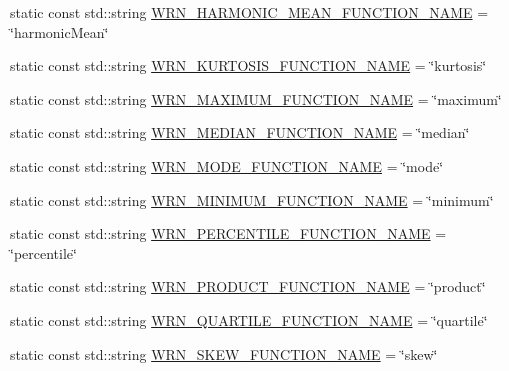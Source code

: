 \begin{DoxyCompactItemize}
\item 
static const std\-::string \hyperlink{classmultiscale_1_1Numeric_a48747552d1ae9179e97e3c9b32e86220}{\-W\-R\-N\-\_\-\-H\-A\-R\-M\-O\-N\-I\-C\-\_\-\-M\-E\-A\-N\-\_\-\-F\-U\-N\-C\-T\-I\-O\-N\-\_\-\-N\-A\-M\-E} = \char`\"{}harmonic\-Mean\char`\"{}
\item 
static const std\-::string \hyperlink{classmultiscale_1_1Numeric_a917a1224a1d3d2dc3ce2937a519b3a03}{\-W\-R\-N\-\_\-\-K\-U\-R\-T\-O\-S\-I\-S\-\_\-\-F\-U\-N\-C\-T\-I\-O\-N\-\_\-\-N\-A\-M\-E} = \char`\"{}kurtosis\char`\"{}
\item 
static const std\-::string \hyperlink{classmultiscale_1_1Numeric_aa76828c54d236550a16b8b3e189a892a}{\-W\-R\-N\-\_\-\-M\-A\-X\-I\-M\-U\-M\-\_\-\-F\-U\-N\-C\-T\-I\-O\-N\-\_\-\-N\-A\-M\-E} = \char`\"{}maximum\char`\"{}
\item 
static const std\-::string \hyperlink{classmultiscale_1_1Numeric_a4ff61e6a5c3cd99f6f69a539d8790ec5}{\-W\-R\-N\-\_\-\-M\-E\-D\-I\-A\-N\-\_\-\-F\-U\-N\-C\-T\-I\-O\-N\-\_\-\-N\-A\-M\-E} = \char`\"{}median\char`\"{}
\item 
static const std\-::string \hyperlink{classmultiscale_1_1Numeric_a1c7fbb1e805d5c6a93c0db380327fb12}{\-W\-R\-N\-\_\-\-M\-O\-D\-E\-\_\-\-F\-U\-N\-C\-T\-I\-O\-N\-\_\-\-N\-A\-M\-E} = \char`\"{}mode\char`\"{}
\item 
static const std\-::string \hyperlink{classmultiscale_1_1Numeric_abe70187af1f3c5e168ee696836e51940}{\-W\-R\-N\-\_\-\-M\-I\-N\-I\-M\-U\-M\-\_\-\-F\-U\-N\-C\-T\-I\-O\-N\-\_\-\-N\-A\-M\-E} = \char`\"{}minimum\char`\"{}
\item 
static const std\-::string \hyperlink{classmultiscale_1_1Numeric_a8d81f8548808bc79d7a63913866d848f}{\-W\-R\-N\-\_\-\-P\-E\-R\-C\-E\-N\-T\-I\-L\-E\-\_\-\-F\-U\-N\-C\-T\-I\-O\-N\-\_\-\-N\-A\-M\-E} = \char`\"{}percentile\char`\"{}
\item 
static const std\-::string \hyperlink{classmultiscale_1_1Numeric_a22bdf6dcebf44567c9ae93f3abb71c9b}{\-W\-R\-N\-\_\-\-P\-R\-O\-D\-U\-C\-T\-\_\-\-F\-U\-N\-C\-T\-I\-O\-N\-\_\-\-N\-A\-M\-E} = \char`\"{}product\char`\"{}
\item 
static const std\-::string \hyperlink{classmultiscale_1_1Numeric_a3ab290a7458614fca9b68a5af7ce3dd8}{\-W\-R\-N\-\_\-\-Q\-U\-A\-R\-T\-I\-L\-E\-\_\-\-F\-U\-N\-C\-T\-I\-O\-N\-\_\-\-N\-A\-M\-E} = \char`\"{}quartile\char`\"{}
\item 
static const std\-::string \hyperlink{classmultiscale_1_1Numeric_a9c6fc5d340716ef73174505cc60773bb}{\-W\-R\-N\-\_\-\-S\-K\-E\-W\-\_\-\-F\-U\-N\-C\-T\-I\-O\-N\-\_\-\-N\-A\-M\-E} = \char`\"{}skew\char`\"{}

\end{DoxyCompactItemize}
